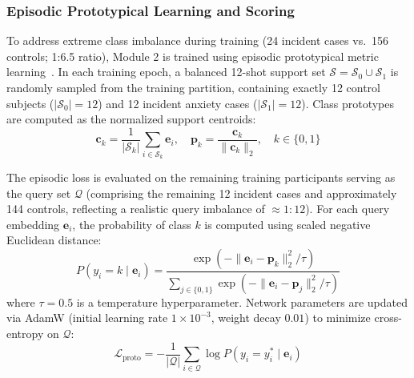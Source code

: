 \documentclass[10pt,letterpaper]{article}
\begin{document}
        \subsubsection*{\textbf{Episodic Prototypical Learning and Scoring}}
        To address extreme class imbalance during training (24 incident cases vs.\ 156 controls; 1:6.5 ratio), Module 2 is trained using episodic prototypical metric learning~\cite{ref_snell}. In each training epoch, a balanced 12-shot support set $\mathcal{S} = \mathcal{S}_0 \cup \mathcal{S}_1$ is randomly sampled from the training partition, containing exactly 12 control subjects ($|\mathcal{S}_0| = 12$) and 12 incident anxiety cases ($|\mathcal{S}_1| = 12$). Class prototypes are computed as the normalized support centroids:
        \begin{equation} \label{eq:proto_calc}
        \mathbf{c}_k = \frac{1}{|\mathcal{S}_k|}\sum_{i \in \mathcal{S}_k} \mathbf{e}_i,\quad \mathbf{p}_k = \frac{\mathbf{c}_k}{\|\mathbf{c}_k\|_2},\quad k \in \{0, 1\}
        \end{equation}

        The episodic loss is evaluated on the remaining training participants serving as the query set $\mathcal{Q}$ (comprising the remaining 12 incident cases and approximately 144 controls, reflecting a realistic query imbalance of $\approx 1:12$). For each query embedding $\mathbf{e}_i$, the probability of class $k$ is computed using scaled negative Euclidean distance:
        \begin{equation} \label{eq:proto_query_prob}
        P(y_i = k \mid \mathbf{e}_i) = \frac{\exp(-\|\mathbf{e}_i - \mathbf{p}_k\|_2^2 / \tau)}{\sum_{j \in \{0, 1\}} \exp(-\|\mathbf{e}_i - \mathbf{p}_j\|_2^2 / \tau)}
        \end{equation}
        where $\tau = 0.5$ is a temperature hyperparameter. Network parameters are updated via AdamW (initial learning rate $1 \times 10^{-3}$, weight decay $0.01$) to minimize cross-entropy on $\mathcal{Q}$:
        \begin{equation} \label{eq:proto_loss}
        \mathcal{L}_{\text{proto}} = -\frac{1}{|\mathcal{Q}|} \sum_{i \in \mathcal{Q}} \log P(y_i = y_i^* \mid \mathbf{e}_i)
        \end{equation}
\end{document}
